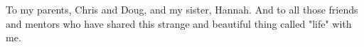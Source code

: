 
To my parents, Chris and Doug, and my sister, Hannah. And to all those friends and mentors who have shared this strange and beautiful thing called "life" with me.
